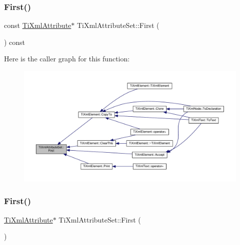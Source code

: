 \subsubsection{\texorpdfstring{First()}{First()}\hspace{0.1cm}{\footnotesize\ttfamily [1/2]}}
{\footnotesize\ttfamily const \hyperlink{class_ti_xml_attribute}{Ti\+Xml\+Attribute}$\ast$ Ti\+Xml\+Attribute\+Set\+::\+First (\begin{DoxyParamCaption}{ }\end{DoxyParamCaption}) const\hspace{0.3cm}{\ttfamily [inline]}}

Here is the caller graph for this function\+:
\nopagebreak
\begin{figure}[H]
\begin{center}
\leavevmode
\includegraphics[width=350pt]{class_ti_xml_attribute_set_a85dfd2b5bae45c94334dced146f5c11a_icgraph}
\end{center}
\end{figure}
\mbox{\label{class_ti_xml_attribute_set_a99703bb08ca2aece2d7ef835de339ba0}} 
\subsubsection{\texorpdfstring{First()}{First()}\hspace{0.1cm}{\footnotesize\ttfamily [2/2]}}
{\footnotesize\ttfamily \hyperlink{class_ti_xml_attribute}{Ti\+Xml\+Attribute}$\ast$ Ti\+Xml\+Attribute\+Set\+::\+First (\begin{DoxyParamCaption}{ }\end{DoxyParamCaption})\hspace{0.3cm}{\ttfamily [inline]}}

